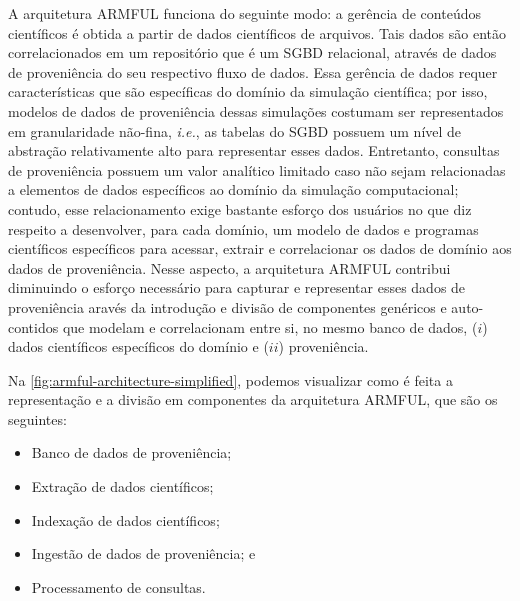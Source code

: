 A arquitetura ARMFUL funciona do seguinte modo: a gerência de conteúdos científicos é obtida a partir de dados científicos de arquivos. Tais dados são então correlacionados em um repositório que é um SGBD relacional, através de dados de proveniência do seu respectivo fluxo de dados. Essa gerência de dados requer características que são específicas do domínio da simulação científica; por isso, modelos de dados de proveniência dessas simulações costumam ser representados em granularidade não-fina, \textit{i.e.}, as tabelas do SGBD possuem um nível de abstração relativamente alto para representar esses dados. Entretanto, consultas de proveniência possuem um valor analítico limitado caso não sejam relacionadas a elementos de dados específicos ao domínio da simulação computacional; contudo, esse relacionamento exige bastante esforço dos usuários no que diz respeito a desenvolver, para cada domínio, um modelo de dados e programas científicos específicos para acessar, extrair e correlacionar os dados de domínio aos dados de proveniência. Nesse aspecto, a arquitetura ARMFUL contribui diminuindo o esforço necessário para capturar e representar esses dados de proveniência aravés da introdução e divisão de componentes genéricos e auto-contidos que modelam e correlacionam entre si, no mesmo banco de dados, (\(i\)) dados científicos específicos do domínio e (\(ii\)) proveniência.

Na \autoref{fig:armful-architecture-simplified}, podemos visualizar como é feita a representação e a divisão em componentes da arquitetura ARMFUL, que são os seguintes:

\begin{itemize}
    \item Banco de dados de proveniência;
    \item Extração de dados científicos;
    \item Indexação de dados científicos;
    \item Ingestão de dados de proveniência; e
    \item Processamento de consultas.
\end{itemize}

